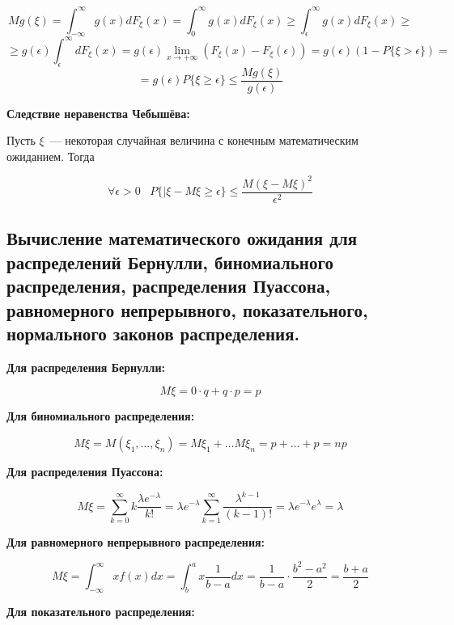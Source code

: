    \[
        Mg(\xi) = \int^{\infty}_{-\infty} g(x)dF_{\xi}(x) = 
        \int^{\infty}_0 g(x) d F_{\xi}(x) \geq \int^{\infty}_{\epsilon}
        g(x)d F_{\xi}(x) \geq 
    \]
    \[
        \geq
        g(\epsilon) \int^{\infty}_{\epsilon} d F_{\xi}(x)
        = g(\epsilon) \lim_{x \to + \infty} (F_{\xi}(x) - F_{\xi}(\epsilon)) =
        g(\epsilon) (1 - P\{\xi > \epsilon\}) =
    \]
    \[
        =
        g(\epsilon)P\{\xi \geq \epsilon\}
        \leq \frac{Mg(\xi)}{g(\epsilon)}
    \]
    \bigskip

\textbf{Следствие неравенства Чебышёва:}
    \smallskip
    
    Пусть $\xi$~--- некоторая случайная величина с конечным математическим
    ожиданием. Тогда 

    \[
        \forall \epsilon > 0 \;\;\; P\{|\xi - M\xi \geq \epsilon\} \leq
        \frac{M(\xi - M\xi)^2}{\epsilon^2}
    \]

\subsection{Вычисление математического ожидания для распределений Бернулли,
биномиального распределения, распределения Пуассона, равномерного непрерывного,
показательного, нормального законов распределения.}

\textbf{Для распределения Бернулли:}
    \smallskip

    \[
        M\xi = 0 \cdot q + q \cdot p = p  
    \]
    \bigskip

\textbf{Для биномиального распределения:}
    \smallskip
    
    \[
        M\xi = M(\xi_1, \dots, \xi_n) = M\xi_1 + \dots M\xi_n = p + \dots + p = np  
    \]
    \bigskip

\textbf{Для распределения Пуассона:}
    \smallskip
    
    \[
        M\xi = \sum^{\infty}_{k = 0} k \frac{\lambda e^{-\lambda}}{k!} =
        \lambda e^{-\lambda} \sum^{\infty}_{k = 1} \frac{\lambda^{k - 1}}{(k - 1)!}=
        \lambda e^{-\lambda} e^{\lambda} = \lambda 
    \]
    \bigskip

\textbf{Для равномерного непрерывного распределения:}
    \smallskip
    
    \[
        M\xi = \int^{\infty}_{-\infty} x f(x)dx =
        \int^a_b x \frac{1}{b - a} dx = \frac{1}{b - a} \cdot \frac{b^2 - a^2}{2} =
        \frac{b + a}{2}  
    \]
    \bigskip

\textbf{Для показательного распределения:}
    \smallskip
    
